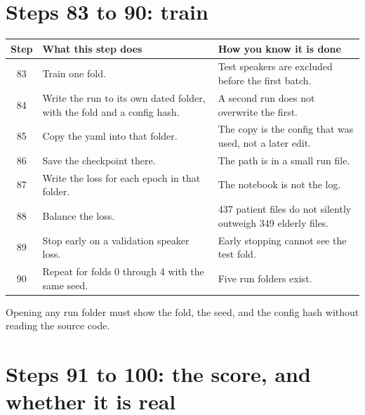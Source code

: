 \documentclass[11pt]{article}
\begin{document}
\section{Steps 83 to 90: train}

\begin{longtable}{cp{6.4cm}p{6.4cm}}
\toprule
Step & What this step does & How you know it is done \\
\midrule
\endhead
83 & Train one fold. & Test speakers are excluded before the first batch. \\
84 & Write the run to its own dated folder, with the fold and a config hash. & A second run does not overwrite the first. \\
85 & Copy the yaml into that folder. & The copy is the config that was used, not a later edit. \\
86 & Save the checkpoint there. & The path is in a small run file. \\
87 & Write the loss for each epoch in that folder. & The notebook is not the log. \\
88 & Balance the loss. & 437 patient files do not silently outweigh 349 elderly files. \\
89 & Stop early on a validation speaker loss. & Early stopping cannot see the test fold. \\
90 & Repeat for folds 0 through 4 with the same seed. & Five run folders exist. \\
\bottomrule
\end{longtable}

Opening any run folder must show the fold, the seed, and the config hash without reading the source code.

\section{Steps 91 to 100: the score, and whether it is real}
\end{document}
